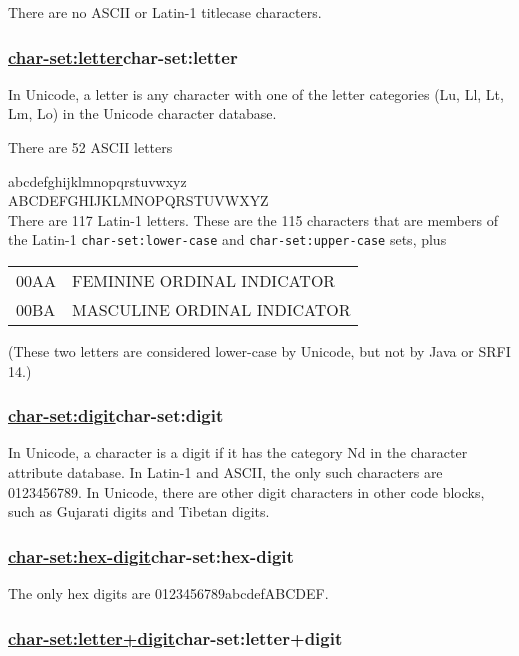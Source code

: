 There are no ASCII or Latin-1 titlecase characters.

\subsubsection{{\href{}{char-set:letter}}{char-set:letter}}\label{char-setletter}

In Unicode, a letter is any character with one of the letter categories
(Lu, Ll, Lt, Lm, Lo) in the Unicode character database.

There are 52 ASCII letters

abcdefghijklmnopqrstuvwxyz\\
ABCDEFGHIJKLMNOPQRSTUVWXYZ\\

There are 117 Latin-1 letters. These are the 115 characters that are
members of the Latin-1 \texttt{char-set:lower-case} and
\texttt{char-set:upper-case} sets, plus

\begin{tabular}{ll}
00AA & FEMININE ORDINAL INDICATOR\tabularnewline
00BA & MASCULINE ORDINAL INDICATOR\tabularnewline
\end{tabular}

(These two letters are considered lower-case by Unicode, but not by Java
or SRFI 14.)

\subsubsection{{\href{}{char-set:digit}}{char-set:digit}}\label{char-setdigit}

In Unicode, a character is a digit if it has the category Nd in the
character attribute database. In Latin-1 and ASCII, the only such
characters are 0123456789. In Unicode, there are other digit characters
in other code blocks, such as Gujarati digits and Tibetan digits.

\subsubsection{{\href{}{char-set:hex-digit}}{char-set:hex-digit}}\label{char-sethex-digit}

The only hex digits are 0123456789abcdefABCDEF.

\subsubsection{{\href{}{char-set:letter+digit}}{char-set:letter+digit}}\label{char-setletterdigit}

